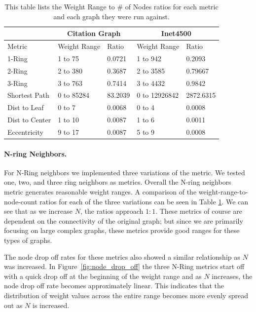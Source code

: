 \begin{table}
\begin{center}
\begin{tabular}{|l|l|l|l|l|}
\hline
 & \multicolumn{2}{|c|}{Citation Graph} & \multicolumn{2}{|c|}{Inet4500} \\
\hline
Metric & Weight Range & Ratio & Weight Range & Ratio \\
\hline
1-Ring& 1 to 75 & 0.0721 & 1 to 942 & 0.2093 \\
2-Ring & 2 to 380 & 0.3687 & 2 to 3585 & 0.79667 \\
3-Ring & 3 to 763 & 0.7414  & 3 to 4432 & 0.9842 \\
Shortest Path & 0 to 85284 & 83.2039 & 0 to 12926842 & 2872.6315 \\
Dist to Leaf & 0 to 7 & 0.0068 & 0 to 4 & 0.0008 \\
Dist to Center & 1 to 10 & 0.0087 & 1 to 6 & 0.0011 \\
Eccentricity & 9 to 17 & 0.0087 & 5 to 9 & 0.0008 \\
\hline
\end{tabular}
\caption{This table lists the Weight Range to \# of Nodes ratios for each metric and each graph they were run against.}
\label{tbl:weight_ratio}
\end{center}
\end{table}



\paragraph*{N-ring Neighbors.}
For N-Ring neighbors we implemented three variations of the metric.  We tested one, two, and three ring neighbors as metrics.  Overall the N-ring neighbors metric generates reasonable weight ranges.  A comparison of the weight-range-to-node-count ratios for each of the three variations can be seen in
Table \ref{tbl:weight_ratio}.  We can see that as we increase $N$, the ratios approach $1:1$.  These metrics of course are dependent on the connectivity of the original graph; but since we are primarily focusing on large complex graphs, these metrics provide good ranges for these types of graphs.

The node drop off rates for these metrics also showed a similar relationship as $N$ was increased.  In Figure~\ref{fig:node_drop_off} the three N-Ring metrics start off with a quick drop off at the beginning of the weight range and as $N$ increases, the node drop off rate becomes approximately linear.  This indicates that the distribution of weight values across the entire range becomes more evenly spread out as $N$ is increased.

